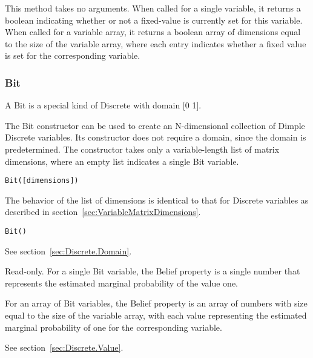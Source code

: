 This method takes no arguments.  When called for a single variable, it returns a boolean indicating whether or not a fixed-value is currently set for this variable.  When called for a variable array, it returns a boolean array of dimensions equal to the size of the variable array, where each entry indicates whether a fixed value is set for the corresponding variable.

\subsubsection{Bit}

A Bit is a special kind of Discrete with domain [0 1].



\ifmatlab
The Bit constructor can be used to create an N-dimensional collection of Dimple Discrete variables.  Its constructor does not require a domain, since the domain is predetermined.  The constructor takes only a variable-length list of matrix dimensions, where an empty list indicates a single Bit variable.

\begin{lstlisting}
Bit([dimensions])
\end{lstlisting}

The behavior of the list of dimensions is identical to that for Discrete variables as described in section~\ref{sec:VariableMatrixDimensions}.

\fi

\ifjava
\begin{lstlisting}
Bit()
\end{lstlisting}
\fi



See section~\ref{sec:Discrete.Domain}.


Read-only.  For a single Bit variable, the Belief property is a single number that represents the estimated marginal probability of the value one.

For an array of Bit variables, the Belief property is an array of numbers with size equal to the size of the variable array, with each value representing the estimated marginal probability of one for the corresponding variable.


See section~\ref{sec:Discrete.Value}.


